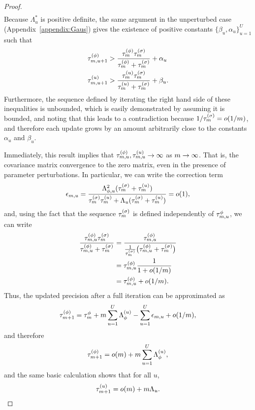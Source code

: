 \begin{proof}
\begin{align*}
   \end{align*}
  Because $\Lambda^*_u$ is positive definite, the same argument in the unperturbed case (Appendix~\ref{appendix:Gaus}) gives the existence of positive constants $\{\beta_u, \alpha_u\}_{u = 1}^U$ such that
  \begin{align*}
    \tau^{(\phi)}_{m, u+1} &> \frac{\tau^{(\phi)}_m\tau^{(\sigma)}_m}{\tau^{(\phi)}_m + \tau^{(\sigma)}_m} + \alpha_u \\
    \tau^{(u)}_{m, u+1} &> \frac{\tau^{(u)}_m\tau^{(\sigma)}_m}{\tau^{(u)}_m + \tau^{(\sigma)}_m} + \beta_u.
  \end{align*}
  Furthermore, the sequence defined by iterating the right hand side of these inequalities is unbounded, which is easily demonstrated by assuming it is bounded, and noting that this leads to a contradiction because $1/\tau^{(\sigma)}_m = o(1/m)$, and therefore each update grows by an amount arbitrarily close to the constants $\alpha_u$ and $\beta_u$.
  
  Immediately, this result implies that $\tau_{m, u}^{(\phi)}, \tau_{m, u}^{(u)} \rightarrow \infty$ as $m \rightarrow \infty$. 
  That is, the covariance matrix convergence to the zero matrix, even in the presence of parameter perturbations. 
  In particular, we can write the correction term
  $$
  \epsilon_{m, u} = \frac{\Lambda^2_{\phi, u}(\tau^{(\sigma)}_m + \tau^{(u)}_m)}{\tau^{(\sigma)}_m\tau^{(u)}_m + \Lambda_u(\tau^{(\sigma)}_m + \tau^{(u)}_m)} = o(1),
  $$
  and, using the fact that the sequence $\tau^{(\sigma)}_m$ is defined independently of $\tau^{\phi}_{m, u}$, we can write 
  \begin{align*}
  \frac{\tau^{(\phi)}_{m, u}\tau^{(\sigma)}_m}{\tau^{(\phi)}_{m, u} + \tau^{(\sigma)}_m} &= \frac{\tau^{(\phi)}_{m, u}}{\frac{1}{\tau^{(\sigma)}_{m}}\big(\tau^{(\phi)}_{m, u} + \tau^{(\sigma)}_{m}\big)} \\
  &= \tau_{m, u}^{(\phi)}\frac{1}{1+o(1/m)} \\
  &= \tau^{(\phi)}_{m, u} + o(1/m).
  \end{align*}
  Thus, the updated precision after a full iteration can be approximated as
  $$
  \tau_{m + 1}^{(\phi)} = \tau^{\phi}_{m} + m\sum_{u = 1}^U \Lambda_{\phi}^{(u)} - \sum_{u = 1}^U\epsilon_{m, u} + o(1/m),
  $$
  and therefore 
  $$
  \tau_{m + 1}^{(\phi)} = o(m) + m\sum_{u = 1}^U \Lambda_{\phi}^{(u)}, 
  $$
  and the same basic calculation shows that for all $u$, 
  $$
  \tau^{(u)}_{m+1} = o(m) + m\Lambda_{u}.
  $$
  

\end{proof}
